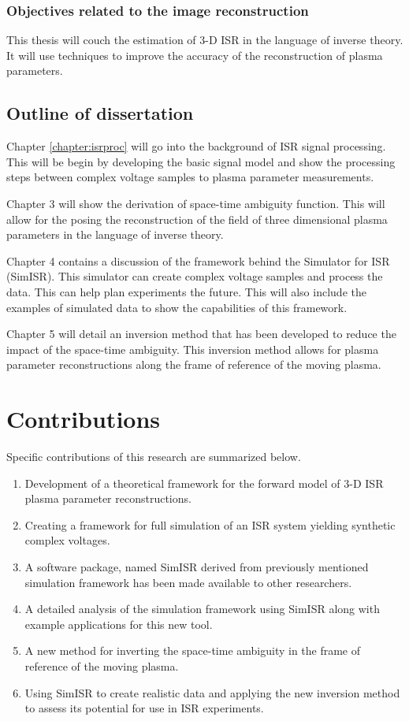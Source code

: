 \subsubsection{Objectives related to the image reconstruction}
This thesis will couch the estimation of 3-D ISR in the language of inverse theory. It will use techniques to improve the accuracy of the reconstruction of plasma parameters.

\subsection{Outline of dissertation}

Chapter \ref{chapter:isrproc} will go into the background of ISR signal processing. This will be begin by developing the basic signal model and show the processing steps between complex voltage samples to plasma parameter measurements.

Chapter 3 will show the derivation of space-time ambiguity function. This will allow for the posing the reconstruction of the field of three dimensional plasma parameters in the language of inverse theory. 

Chapter 4 contains a discussion of the framework behind the Simulator for ISR (SimISR). This simulator can create complex voltage samples and process the data. This can help plan experiments the future. This will also include the examples of simulated data to show the capabilities of this framework.

Chapter 5 will detail an inversion method that has been developed to reduce the impact of the space-time ambiguity. This inversion method allows for plasma parameter reconstructions along the frame of reference of the moving plasma.

\section{Contributions}
Specific contributions of this research are summarized below.

\begin{enumerate}
\item Development of a theoretical framework for the forward model of 3-D ISR plasma parameter reconstructions.
\item Creating a framework for full simulation of an ISR system yielding synthetic complex voltages.
\item A software package, named SimISR derived from previously mentioned simulation framework has been made available to other researchers.
\item A detailed analysis of the simulation framework using SimISR along with example applications for this new tool.
\item A new method for inverting the space-time ambiguity in the frame of reference of the moving plasma.
\item Using SimISR to create realistic data and applying the new inversion method to assess its potential for use in ISR experiments.
\end{enumerate}